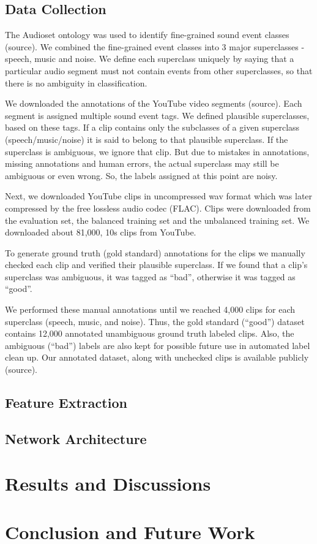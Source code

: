 \documentclass{article}
\begin{document}
\subsection{Data Collection}
The Audioset \cite{gemmeke2017audio} ontology was used to identify fine-grained sound event classes (source). We combined the fine-grained event classes into 3 major superclasses - speech, music and noise. We define each superclass uniquely by saying that a particular audio segment must not contain events from other superclasses, so that there is no ambiguity in classification. 

We downloaded the annotations of the YouTube video segments (source). Each segment is assigned multiple sound event tags. We defined plausible superclasses, based on these tags. If a clip contains only the subclasses of a given superclass (speech/music/noise) it is said to belong to that plausible superclass. If the superclass is ambiguous, we ignore that clip. But due to mistakes in annotations, missing annotations and human errors, the actual superclass may still be ambiguous or even wrong. So, the labels assigned at this point are noisy. 

Next, we downloaded YouTube clips in uncompressed wav format which was later compressed by the free lossless audio codec (FLAC). Clips were downloaded from the evaluation set, the balanced training set and the unbalanced training set. We downloaded about 81,000, 10s clips from YouTube.  

To generate ground truth (gold standard) annotations for the clips we manually checked each clip and verified their plausible superclass. If we found that a clip’s superclass was ambiguous, it was tagged as “bad”, otherwise it was tagged as “good”.  

We performed these manual annotations until we reached 4,000 clips for each superclass (speech, music, and noise). Thus, the gold standard (“good”) dataset contains 12,000 annotated unambiguous ground truth labeled clips. Also, the ambiguous (“bad”) labels are also kept for possible future use in automated label clean up. Our annotated dataset, along with unchecked clips is available publicly (source). 

\subsection{Feature Extraction}

\subsection{Network Architecture}

\section{Results and Discussions}





\section{Conclusion and Future Work}


\printbibliography
\end{document}
